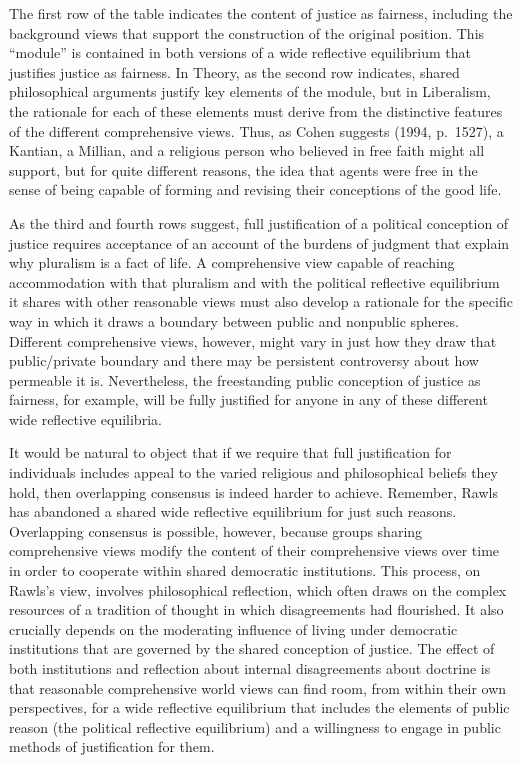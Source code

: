 \documentclass[]{article}
\begin{document}
The first row of the table indicates the content of justice as fairness,
including the background views that support the construction of the
original position. This ``module'' is contained in both versions of a
wide reflective equilibrium that justifies justice as fairness. In
Theory, as the second row indicates, shared philosophical arguments
justify key elements of the module, but in Liberalism, the rationale for
each of these elements must derive from the distinctive features of the
different comprehensive views. Thus, as Cohen suggests (1994, p.~1527),
a Kantian, a Millian, and a religious person who believed in free faith
might all support, but for quite different reasons, the idea that agents
were free in the sense of being capable of forming and revising their
conceptions of the good life.

As the third and fourth rows suggest, full justification of a political
conception of justice requires acceptance of an account of the burdens
of judgment that explain why pluralism is a fact of life. A
comprehensive view capable of reaching accommodation with that pluralism
and with the political reflective equilibrium it shares with other
reasonable views must also develop a rationale for the specific way in
which it draws a boundary between public and nonpublic spheres.
Different comprehensive views, however, might vary in just how they draw
that public/private boundary and there may be persistent controversy
about how permeable it is. Nevertheless, the freestanding public
conception of justice as fairness, for example, will be fully justified
for anyone in any of these different wide reflective equilibria.

It would be natural to object that if we require that full justification
for individuals includes appeal to the varied religious and
philosophical beliefs they hold, then overlapping consensus is indeed
harder to achieve. Remember, Rawls has abandoned a shared wide
reflective equilibrium for just such reasons. Overlapping consensus is
possible, however, because groups sharing comprehensive views modify the
content of their comprehensive views over time in order to cooperate
within shared democratic institutions. This process, on Rawls's view,
involves philosophical reflection, which often draws on the complex
resources of a tradition of thought in which disagreements had
flourished. It also crucially depends on the moderating influence of
living under democratic institutions that are governed by the shared
conception of justice. The effect of both institutions and reflection
about internal disagreements about doctrine is that reasonable
comprehensive world views can find room, from within their own
perspectives, for a wide reflective equilibrium that includes the
elements of public reason (the political reflective equilibrium) and a
willingness to engage in public methods of justification for them.
\end{document}
